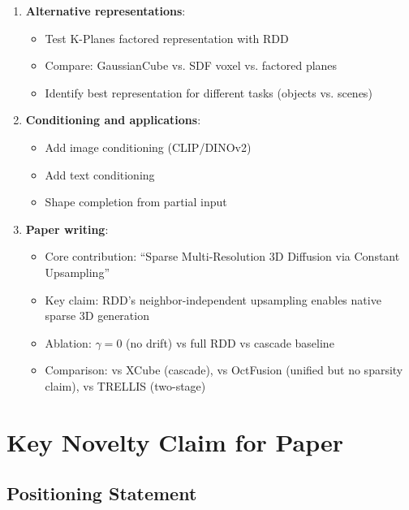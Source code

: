\documentclass[11pt, a4paper]{article}
\begin{document}
\begin{enumerate}
    \item \textbf{Alternative representations}:
    \begin{itemize}
        \item Test K-Planes factored representation with RDD
        \item Compare: GaussianCube vs. SDF voxel vs. factored planes
        \item Identify best representation for different tasks (objects vs. scenes)
    \end{itemize}
    
    \item \textbf{Conditioning and applications}:
    \begin{itemize}
        \item Add image conditioning (CLIP/DINOv2)
        \item Add text conditioning
        \item Shape completion from partial input
    \end{itemize}
    
    \item \textbf{Paper writing}:
    \begin{itemize}
        \item Core contribution: ``Sparse Multi-Resolution 3D Diffusion via Constant Upsampling''
        \item Key claim: RDD's neighbor-independent upsampling enables native sparse 3D generation
        \item Ablation: $\gamma=0$ (no drift) vs full RDD vs cascade baseline
        \item Comparison: vs XCube (cascade), vs OctFusion (unified but no sparsity claim), vs TRELLIS (two-stage)
    \end{itemize}
\end{enumerate}

\section{Key Novelty Claim for Paper}

\subsection{Positioning Statement}
\end{document}
